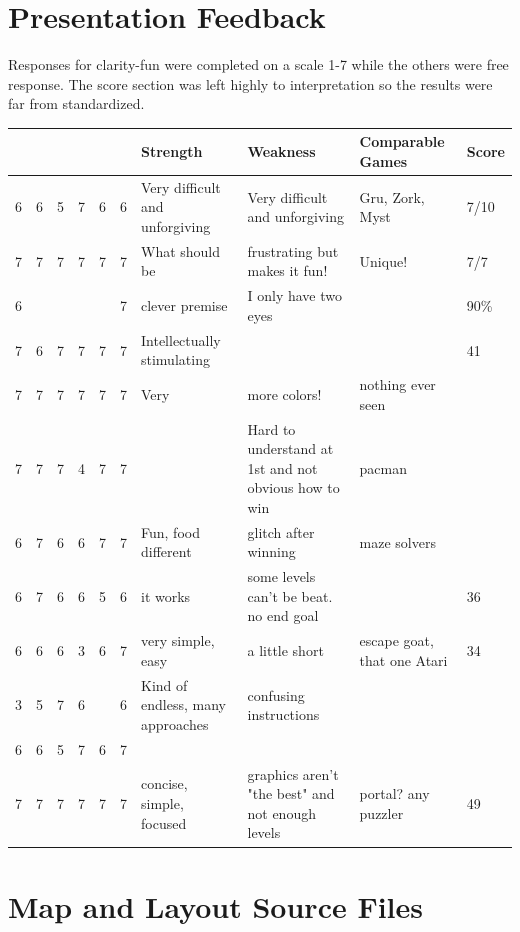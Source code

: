 \documentclass{scrreprt}
\newcommand*\rot{\rotatebox{90}}
\begin{document}
	\chapter{Presentation Feedback}\label{chp:pres}
		Responses for clarity-fun were completed on a scale 1-7 while the others were free response. The score section was left highly to interpretation so the results were far from standardized. 
		\begin{center}
		\begin{tabularx}{\textwidth}{ |c|c|c|c|c|c|X|X|X|X| }
			\hline
			\rot{Clarity} & \rot{Flow} & \rot{Balance} & \rot{Length} & \rot{Integration \ } & \rot{Fun} & Strength & Weakness & Comparable Games & Score \\\hline
			6 & 6 & 5 & 7 & 6 & 6 & Very difficult and unforgiving & Very difficult and unforgiving & Gru, Zork, Myst & 7/10 \\\hline
			7 & 7 & 7 & 7 & 7 & 7 & What should be & frustrating but makes it fun! & Unique! & 7/7 \\\hline
			6 & & & & & 7 & clever premise & I only have two eyes & & 90\% \\\hline
			7 & 6 & 7 & 7 & 7 & 7 & Intellectually stimulating & & & 41 \\\hline
			7 & 7 & 7 & 7 & 7 & 7 & Very \Ovalbox{fun} & more colors! & nothing ever seen & \\\hline
			7 & 7 & 7 & 4 & 7 & 7 & & Hard to understand at 1st and not obvious how to win & pacman & \\\hline
			6 & 7 & 6 & 6 & 7 & 7 & Fun, food different & glitch after winning & maze solvers & \\\hline
			6 & 7 & 6 & 6 & 5 & 6 & it works & some levels can't be beat. no end goal & & 36 \\\hline
			6 & 6 & 6 & 3 & 6 & 7 & very simple, easy & a little short & escape goat, that one Atari & 34 \\\hline
			3 & 5 & 7 & 6 & & 6 & Kind of endless, many approaches & confusing instructions & & \\\hline
			6 & 6 & 5 & 7 & 6 & 7 & & & & \\\hline
			7 & 7 & 7 & 7 & 7 & 7 & concise, simple, focused & graphics aren't "the best" and not enough levels & portal? any puzzler & 49 \\\hline
		\end{tabularx}
		\end{center}
	
	\chapter{Map and Layout Source Files}\label{chp:map-files}
		
\end{document}
